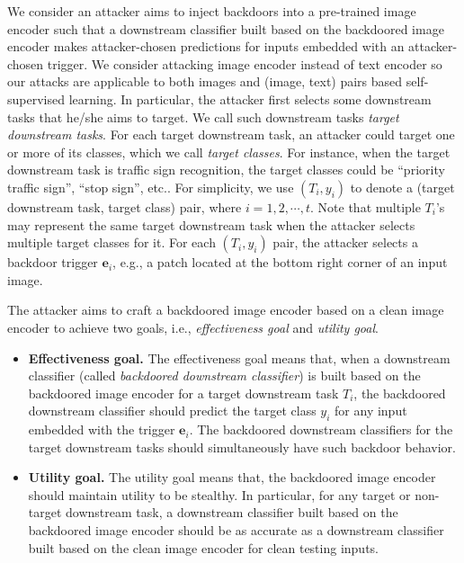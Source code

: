  We consider an attacker aims to inject backdoors into a pre-trained image encoder such that a downstream classifier built based on the backdoored image encoder makes attacker-chosen predictions for 
inputs embedded with an attacker-chosen trigger. 
We consider attacking image encoder instead of text encoder so our attacks are applicable to both images and (image, text)  pairs based self-supervised learning. 
In particular, the attacker first selects some downstream tasks that he/she aims to target. We call such downstream tasks  \emph{target downstream tasks}. For each target downstream task, an attacker could target one or more of its classes, which we call \emph{target classes}. For instance, when the target downstream task is traffic sign recognition, the target classes could be  ``priority traffic sign'', ``stop sign'', etc.. For simplicity, we use $(T_i, y_i)$ to denote a (target downstream task, target class) pair, where $i=1, 2, \cdots, t$. Note that multiple $T_i$'s may represent the same target downstream task when the attacker selects multiple target classes for it.   For each $(T_i, y_i)$ pair, the attacker  selects a backdoor trigger  $\mathbf{e}_i$, e.g., a patch located at the bottom right corner of an input image. 

The attacker aims to craft a backdoored image encoder based on a clean image encoder to achieve two goals, i.e., \emph{effectiveness goal} and \emph{utility goal}. 
\begin{itemize}
    \item {\bf Effectiveness goal.} The effectiveness goal means that, when a downstream classifier (called \emph{backdoored downstream classifier}) is built based on the backdoored image encoder for  a target downstream task $T_i$,  the backdoored downstream classifier should predict the target class $y_i$ for any input embedded with the trigger $\mathbf{e}_i$.  The backdoored downstream classifiers  for the target downstream tasks should simultaneously have such backdoor behavior. 
    \item {\bf Utility goal.} The utility goal means that, the backdoored image encoder should maintain utility to be stealthy. In particular, for any target or non-target downstream task, a downstream classifier built based on the backdoored image encoder should be as accurate as a downstream classifier built based on the clean image encoder for clean testing inputs. 
\end{itemize}




